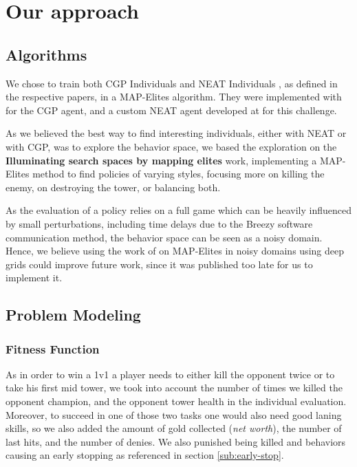 \section{Our approach}

\subsection{Algorithms}
We chose to train both CGP Individuals  \cite{CGP} and NEAT Individuals \cite{NEAT_1}, as defined in the respective papers, in a MAP-Elites algorithm. They were implemented with  for the CGP agent, and a custom NEAT agent developed at  for this challenge.

As we believed the best way to find interesting individuals, either with NEAT or with CGP, was to explore the behavior space, we based the exploration on the \textbf{Illuminating search spaces by mapping elites} \cite{MapElites} work, implementing a MAP-Elites method to find policies of varying styles, focusing more on killing the enemy, on destroying the tower, or balancing both. 

As the evaluation of a policy relies on a full game which can be heavily influenced by small perturbations, including time delays due to the Breezy software communication method, the behavior space can be seen as a noisy domain. Hence, we believe using the work of \cite{noisy-map-elites} on MAP-Elites in noisy domains using deep grids could improve future work, since it was published too late for us to implement it. 

\subsection{Problem Modeling}
\label{sec:representation choice}

\subsubsection{Fitness Function}
As in order to win a 1v1 a player needs to either kill the opponent twice or to take his first mid tower, we took into account the number of times we killed the opponent champion, and the opponent tower health in the individual evaluation. Moreover, to succeed in one of those two tasks one would also need good laning skills, so we also added the amount of gold collected (\textit{net worth}), the number of last hits, and the number of denies. We also punished being killed and behaviors causing an early stopping as referenced in section \ref{sub:early-stop}.

